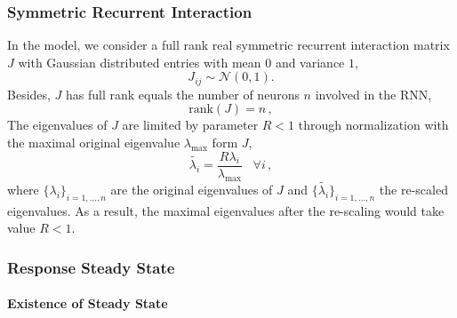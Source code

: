 \documentclass[11pt]{article}
\begin{document}
	\subsubsection{Symmetric Recurrent Interaction} \label{sec:symmetric_recurrent_interaction}
	In the model, we consider a full rank real symmetric recurrent interaction matrix $J$ with Gaussian distributed entries with mean $0$ and variance $1$,
		\begin{equation} \label{eq:gaussian_distribution}
			{J_{ij}} \sim \mathcal{N}(0, 1).
		\end{equation}
	Besides, $J$ has full rank equals the number of neurons $n$ involved in the RNN, 
		\begin{equation}
			\text{rank} (J) = n \, , 
		\end{equation}
 	The eigenvalues of $J$ are limited by parameter $R < 1$ through normalization with the maximal original eigenvalue $\lambda_{\text{max}}$ form $J$, 
		\begin{equation} \label{eq:eigval_normal}
			\tilde{\lambda_i} = \frac{R \lambda_i}{\lambda_{\text{max}}} \, \, \, \, \, \forall i \, ,
		\end{equation}
	where $\{\lambda_i\}_{i=1, ..., n}$ are the original eigenvalues of $J$ and $\{\tilde{\lambda_i}\}_{i = 1,...,n}$ the re-scaled eigenvalues. As a result, the maximal eigenvalues after the re-scaling would take value $R <1$.  
	
	\subsubsection{Response Steady State} \label{sec:steady_state_response_sym}
	
	\paragraph{Existence of Steady State}
	
\end{document}
